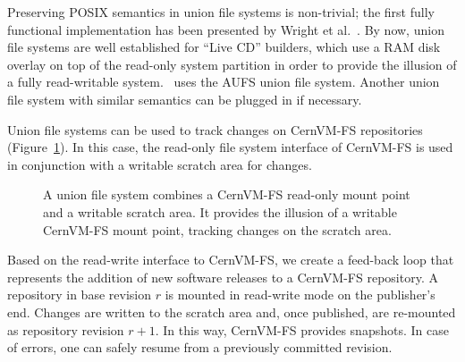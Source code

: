 Preserving POSIX semantics in union file systems is non-trivial; the first fully functional implementation has been presented by Wright et al.~\cite{unionfs04}.
By now, union file systems are well established for ``Live CD'' builders, which use a RAM disk overlay on top of the read-only system partition in order to provide the illusion of a fully read-writable system.
\cvmfs\ uses the AUFS union file system.
Another union file system with similar semantics can be plugged in if necessary.

Union file systems can be used to track changes on CernVM-FS repositories (Figure~\ref{fig:overlay}).
In this case, the read-only file system interface of CernVM-FS is used in conjunction with a writable scratch area for changes.

\begin{figure}
	\begin{center}
		\resizebox{0.5\textwidth}{!}{}
	\end{center}
	\label{fig:overlay}
	\caption{A union file system combines a CernVM-FS read-only mount point and a writable scratch area.  
		It provides the illusion of a writable CernVM-FS mount point, tracking changes on the scratch area.}
\end{figure}

Based on the read-write interface to CernVM-FS, we create a feed-back loop that represents the addition of new software releases to a CernVM-FS repository.
A repository in base revision $r$ is mounted in read-write mode on the publisher's end.
Changes are written to the scratch area and, once published, are re-mounted as repository revision $r+1$.
In this way, CernVM-FS provides snapshots. 
In case of errors, one can safely resume from a previously committed revision.
